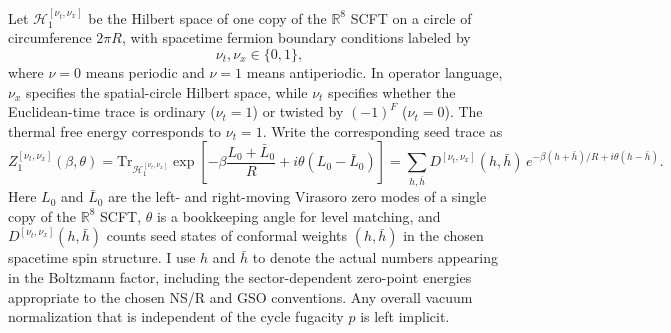 \documentclass[11pt]{article}
\newcommand{\mc}[1]{\mathcal{#1}}
\newcommand{\bR}{\mathbb{R}}
\begin{document}
Let $\mc H_1^{[\nu_t,\nu_x]}$ be the Hilbert space of one copy of the $\bR^8$ SCFT on a circle of circumference $2\pi R$, with spacetime fermion boundary conditions labeled by
\begin{equation}\label{eq:target-spin-structure}
\nu_t,\nu_x\in \{0,1\},
\end{equation}
where $\nu=0$ means periodic and $\nu=1$ means antiperiodic. In operator language, $\nu_x$ specifies the spatial-circle Hilbert space, while $\nu_t$ specifies whether the Euclidean-time trace is ordinary ($\nu_t=1$) or twisted by $(-1)^F$ ($\nu_t=0$). The thermal free energy corresponds to $\nu_t=1$. Write the corresponding seed trace as
\begin{equation}\label{eq:seed-trace}
Z_1^{[\nu_t,\nu_x]}(\beta,\theta)
=
\mathrm{Tr}_{\mc H_1^{[\nu_t,\nu_x]}}
\exp\!\left[
-\beta \frac{L_0+\bar L_0}{R}
+i\theta(L_0-\bar L_0)
\right]
=
\sum_{h,\bar h} D^{[\nu_t,\nu_x]}(h,\bar h)\,
e^{-\beta(h+\bar h)/R+i\theta(h-\bar h)}.
\end{equation}
Here $L_0$ and $\bar L_0$ are the left- and right-moving Virasoro zero modes of a single copy of the $\bR^8$ SCFT, $\theta$ is a bookkeeping angle for level matching, and $D^{[\nu_t,\nu_x]}(h,\bar h)$ counts seed states of conformal weights $(h,\bar h)$ in the chosen spacetime spin structure. I use $h$ and $\bar h$ to denote the actual numbers appearing in the Boltzmann factor, including the sector-dependent zero-point energies appropriate to the chosen NS/R and GSO conventions. Any overall vacuum normalization that is independent of the cycle fugacity $p$ is left implicit.
\end{document}
